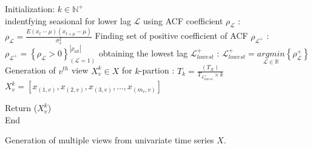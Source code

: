 \documentclass[a4paper, fleqn]{cas-sc}
\theoremstyle{definition}
\theoremstyle{remark}
\begin{document}
\newcommand\mycommfont[1]{\footnotesize\ttfamily\textcolor{blue}{#1}}

\begin{algorithm}[!ht]
  \DontPrintSemicolon
  
    
  Initialization:  $k \in \mathbb{N}^+$\\ 
  indentfying seasional for lower lag $\mathscr{L}$ using ACF coefficient $\rho_{\mathscr{L}}$ :  
  $\rho_{\mathscr{L}}=\frac{E (x_t-\mu) (x_{t+\mu} -\mu)}{\sigma_x^2}$ 
  Finding set of positive coefficient of ACF $\rho_{\mathscr{L}^+}$ :  
  $\rho_{\mathscr{L}^+}= \left\{\rho_{\mathscr{L}} > 0 \right\}_{(\mathscr{L}=1)}^{ \left| \rho_{all} \right|}$ 
  obtaining the lowest lag $\mathscr{L}_{lowest}^+$ :  
  $ \mathscr{L}_{lowest}^+ = \underset{\mathscr{L} \in \mathbb{R}}{arg min} \left\{\rho_{\mathscr{L}}^+  \right\}$ 
  Generation of $v^{th}$ view $X_v^k \in X$ for $k$-partion :  
  $T_k=\frac{(T_X)}{T_{ \mathscr{L}_{lowest}^+ }\times k}$ 
  $X_v^k = [x_{(1, v)}, x_{(2, v)}, x_{(3, v)},  \dots , x_{(m_v, v)}]$

  Return ($X_v^k$)\\
  End
  \caption{Generation of multiple views from univariate time series $X$.}\label{alg1}
  \end{algorithm}
  
\end{document}
